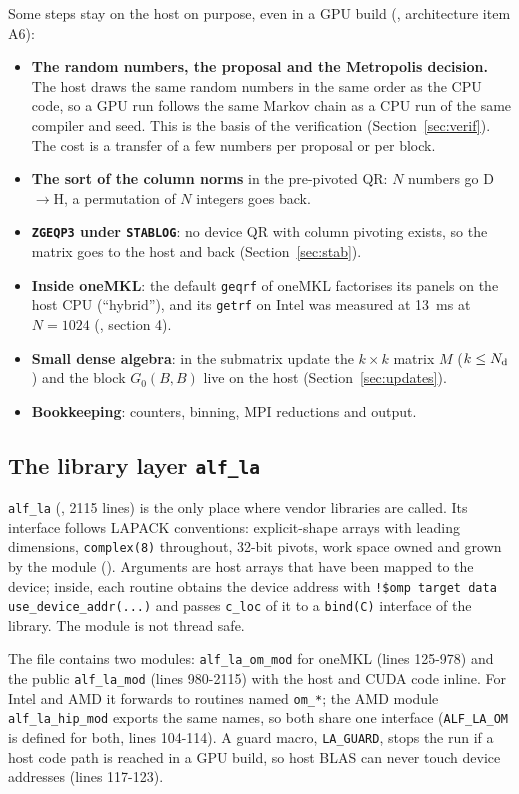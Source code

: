 Some steps stay on the host on purpose, even in a GPU build (, architecture item A6):
\begin{itemize}
\item \textbf{The random numbers, the proposal and the Metropolis decision.} The host draws the same random numbers in the same order as the CPU code, so a GPU run follows the same Markov chain as a CPU run of the same compiler and seed. This is the basis of the verification (Section~\ref{sec:verif}). The cost is a transfer of a few numbers per proposal or per block.
\item \textbf{The sort of the column norms} in the pre-pivoted QR: $N$ numbers go D$\to$H, a permutation of $N$ integers goes back.
\item \textbf{\texttt{ZGEQP3} under \texttt{STABLOG}}: no device QR with column pivoting exists, so the matrix goes to the host and back (Section~\ref{sec:stab}).
\item \textbf{Inside oneMKL}: the default \texttt{geqrf} of oneMKL factorises its panels on the host CPU (``hybrid''), and its \texttt{getrf} on Intel was measured at 13~ms at $N=1024$ (, section 4). %
\item \textbf{Small dense algebra}: in the submatrix update the $k\times k$ matrix $M$ ($k\le N_{\rm d}$) and the block $G_0(B,B)$ live on the host (Section~\ref{sec:updates}).
\item \textbf{Bookkeeping}: counters, binning, MPI reductions and output.
\end{itemize}

\subsection{The library layer \texttt{alf\_la}}

\texttt{alf\_la} (, 2115 lines) is the only place where vendor libraries are called. Its interface follows LAPACK conventions: explicit-shape arrays with leading dimensions, \texttt{complex(8)} throughout, 32-bit pivots, work space owned and grown by the module (). Arguments are host arrays that have been mapped to the device; inside, each routine obtains the device address with \texttt{!\$omp target data use\_device\_addr(...)} and passes \texttt{c\_loc} of it to a \texttt{bind(C)} interface of the library. The module is not thread safe.

The file contains two modules: \texttt{alf\_la\_om\_mod} for oneMKL (lines 125-978) and the public \texttt{alf\_la\_mod} (lines 980-2115) with the host and CUDA code inline. For Intel and AMD it forwards to routines named \texttt{om\_*}; the AMD module \texttt{alf\_la\_hip\_mod} exports the same names, so both share one interface (\texttt{ALF\_LA\_OM} is defined for both, lines 104-114). A guard macro, \texttt{LA\_GUARD}, stops the run if a host code path is reached in a GPU build, so host BLAS can never touch device addresses (lines 117-123).

